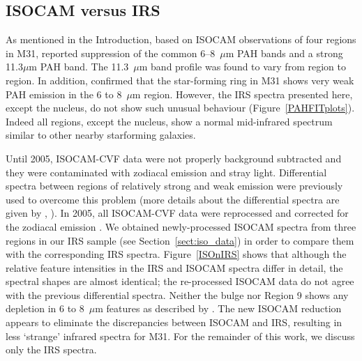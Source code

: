 \subsection{ISOCAM versus IRS}
\label{sect:iso_vs_irs}

As mentioned in the Introduction, based on ISOCAM observations of four regions in M31, \citet{1998Cesarsky} reported 
suppression of the common 6--8~$\mu$m PAH bands and a strong 11.3$\mu$m PAH band.
The 11.3~$\mu$m band profile was found to vary from region to region.  
In addition, \citet{Pagani_1999} confirmed that the star-forming ring in M31 shows very weak PAH emission in the 6 to 8~$\mu$m region. 
However, the IRS spectra presented here, except the nucleus, do not show such unusual behaviour (Figure~\ref{PAHFITplots}). 
Indeed all regions, except the nucleus, show a normal mid-infrared spectrum similar to other nearby starforming galaxies. 

Until 2005, ISOCAM-CVF data were not properly background subtracted and they were contaminated with zodiacal emission and stray light. 
Differential spectra between regions of relatively strong and weak emission were previously used to overcome this problem 
(more details about the differential spectra are given by \citealt{1998Cesarsky}, \citealt{Pagani_1999}). 
In 2005, all ISOCAM-CVF data were reprocessed  and corrected for the zodiacal emission \citep{Boulanger_F_2005}. 
We obtained newly-processed ISOCAM spectra from three regions in our IRS sample (see Section~\ref{sect:iso_data}) 
in order to compare them with the corresponding IRS spectra.
Figure~\ref{ISOnIRS} shows that although the relative feature intensities  in the IRS and ISOCAM 
spectra differ in detail, the spectral shapes are almost identical;
the re-processed ISOCAM data do not agree with the previous differential spectra.
Neither the bulge nor Region 9 shows any depletion in  6 to 8~$\mu$m features as described by \citet{1998Cesarsky}. 
The new ISOCAM reduction appears to eliminate the discrepancies between ISOCAM and IRS, resulting
in less `strange' infrared spectra for M31. For the remainder of this work, we discuss only the IRS spectra.



